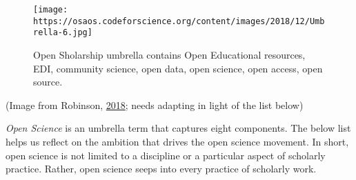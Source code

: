 \documentclass[
  letterpaper,
  DIV=11,
  numbers=noendperiod]{scrreport}
\begin{document}
\begin{figure}

{\centering \texttt{[image: https://osaos.codeforscience.org/content/images/2018/12/Umbrella-6.jpg]}

}

\caption{Open Sholarship umbrella contains Open Educational resources,
EDI, community science, open data, open science, open access, open
source.}

\end{figure}

(Image from Robinson,
\href{https://osaos.codeforscience.org/what-is-open/}{2018}; needs
adapting in light of the list below)

\emph{Open Science} is an umbrella term that captures eight components.
The below list helps us reflect on the ambition that drives the open
science movement. In short, open science is not limited to a discipline
or a particular aspect of scholarly practice. Rather, open science seeps
into every practice of scholarly work.
\end{document}
